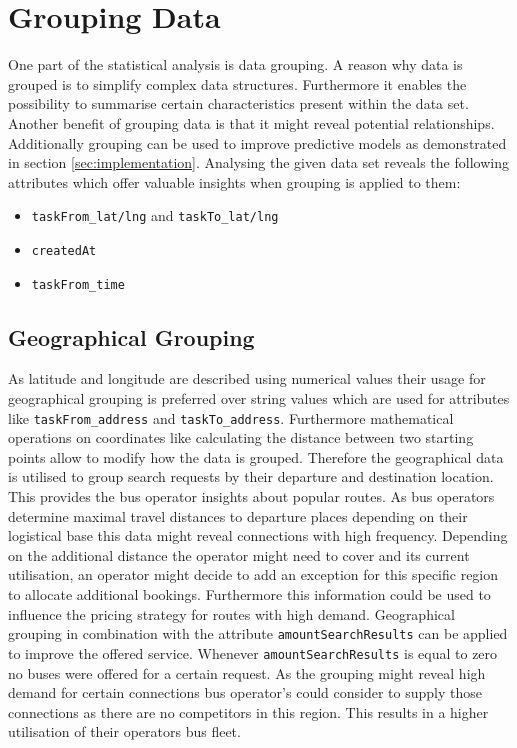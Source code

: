 \section{Grouping Data}
One part of the statistical analysis is data grouping. A reason why data is grouped is to simplify complex data structures. Furthermore it enables the possibility to summarise certain characteristics present within the data set. Another benefit of grouping data is that it might reveal potential relationships. Additionally grouping can be used to improve predictive models as demonstrated in section \ref{sec:implementation}.
Analysing the given data set reveals the following attributes which offer valuable insights when grouping is applied to them: 
\begin{itemize}
\item \verb|taskFrom_lat/lng| and \verb|taskTo_lat/lng|
\item \verb|createdAt|
\item \verb|taskFrom_time|
\end{itemize}
\subsection{Geographical Grouping}
As latitude and longitude are described using numerical values their usage for geographical grouping is preferred over string values which are used for attributes like \verb|taskFrom_address| and \verb|taskTo_address|. Furthermore mathematical operations on coordinates like calculating the distance between two starting points allow to modify how the data is grouped. Therefore the geographical data is utilised to group search requests by their departure and destination location. This provides the bus operator insights about popular routes. As bus operators determine maximal travel distances to departure places depending on their logistical base this data might reveal connections with high frequency. Depending on the additional distance the operator might need to cover and its current utilisation, an operator might decide to add an exception for this specific region to allocate additional bookings. Furthermore this information could be used to influence the pricing strategy for routes with high demand.
Geographical grouping in combination with the attribute \verb|amountSearchResults| can be applied to improve the offered service. Whenever \verb|amountSearchResults| is equal to zero no buses were offered for a certain request. As the grouping might reveal high demand for certain connections bus operator's could consider to supply those connections as there are no competitors in this region. This results in a higher utilisation of their operators bus fleet. 
